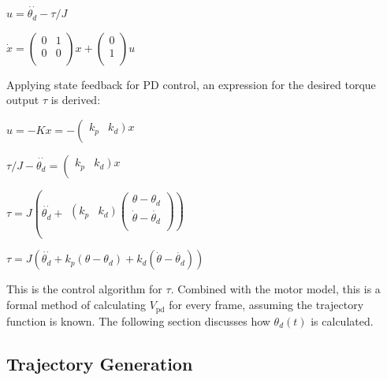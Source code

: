 \documentclass[11pt]{article}
\begin{document}
\begin{center}
\(u=\overset{\cdot \cdot }{\theta _d}-\tau /J\)

\(\dot{x}=\left(
\begin{array}{cc}
 0 & 1 \\
 0 & 0 \\
\end{array}
\right)x+\left(
\begin{array}{c}
 0 \\
 1 \\
\end{array}
\right)u\)
\end{center}

Applying state feedback for PD control, an expression for the desired torque output $\tau $ is derived:

\begin{center}
\(u=-K x=-\left(
\begin{array}{cc}
 k_p & \left.k_d\right)x \\
\end{array}
\right.\)

\(\tau /J-\overset{\cdot \cdot }{\theta _d}=\left(
\begin{array}{cc}
 k_p & \left.k_d\right)x \\
\end{array}
\right.\)

\(\tau =J\left(\overset{\cdot \cdot }{\theta _d}+
\begin{array}{cc}
 \left(k_p\right. & \left.\left.k_d\right)\left(
\begin{array}{c}
 \theta -\theta _d \\
 \dot{\theta }-\dot{\theta _d} \\
\end{array}
\right)\right) \\
\end{array}
\right.\)

\(\tau =J\left(\overset{\cdot \cdot }{\theta _d}+k_p\left(\theta -\theta _d\right)+k_d\left(\dot{\theta }-\dot{\theta _d}\right)\right)\)
\end{center}

This is the control algorithm for $\tau $. Combined with the motor model, this is a formal method of calculating \(V_{\text{pd}}\) for every frame,
assuming the trajectory function is known. The following section discusses how \(\theta _d(t)\) is calculated.

\subsection{Trajectory Generation}
\end{document}
